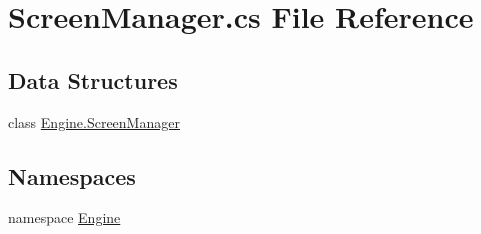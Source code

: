 \hypertarget{a00185}{}\section{Screen\+Manager.\+cs File Reference}
\label{a00185}
\subsection*{Data Structures}
\begin{DoxyCompactItemize}
\item 
class \hyperlink{a00538}{Engine.\+Screen\+Manager}
\end{DoxyCompactItemize}
\subsection*{Namespaces}
\begin{DoxyCompactItemize}
\item 
namespace \hyperlink{a00240}{Engine}
\end{DoxyCompactItemize}
